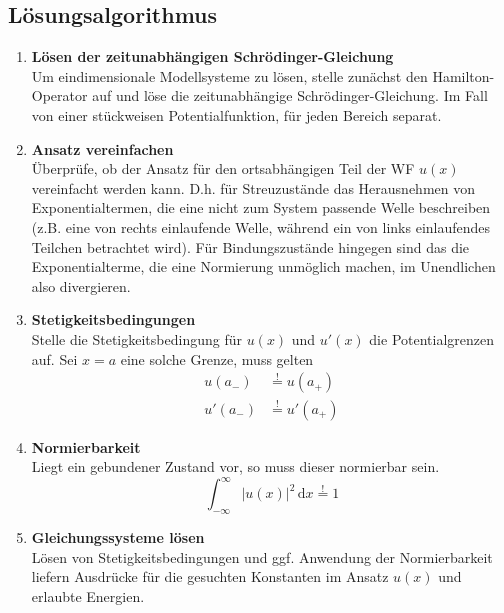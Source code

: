\documentclass{article}
\newcommand{\diff}{\mathrm{d}}
\begin{document}
\subsection{Lösungsalgorithmus}
	\begin{enumerate}
		\item \textbf{Lösen der zeitunabhängigen Schrödinger-Gleichung}\\
		Um eindimensionale Modellsysteme zu lösen, stelle zunächst den Hamilton-Operator auf und löse die zeitunabhängige Schrödinger-Gleichung. Im Fall von einer stückweisen Potentialfunktion, für jeden Bereich separat.
			
		\item \textbf{Ansatz vereinfachen}\\
	Überprüfe, ob der Ansatz für den ortsabhängigen Teil der WF $u(x)$ vereinfacht werden kann. D.h. für Streuzustände das Herausnehmen von Exponentialtermen, die eine nicht zum System passende Welle beschreiben (z.B. eine von rechts einlaufende Welle, während ein von links einlaufendes Teilchen betrachtet wird). Für Bindungszustände hingegen sind das die Exponentialterme, die eine Normierung unmöglich machen, im Unendlichen also divergieren.\\
		
		\item \textbf{Stetigkeitsbedingungen}\\
	Stelle die Stetigkeitsbedingung für $u(x)$ und $u'(x)$ die Potentialgrenzen auf. Sei $x=a$ eine solche Grenze, muss gelten
			\begin{align}
				u(a_-) &\stackrel{!}{=} u(a_+) \\
				u'(a_-) &\stackrel{!}{=} u'(a_+)	
			\end{align}
		
		\item \textbf{Normierbarkeit}\\
		Liegt ein gebundener Zustand vor, so muss dieser normierbar sein.
			\begin{equation}
				\int_{-\infty}^{\infty}|u(x)|^2\,\diff x \stackrel{!}{=} 1
			\end{equation}
			
		\item \textbf{Gleichungssysteme lösen}\\
		Lösen von Stetigkeitsbedingungen und ggf. Anwendung der Normierbarkeit liefern  Ausdrücke für die gesuchten Konstanten im Ansatz $u(x)$ und erlaubte Energien.
	\end{enumerate}
\end{document}
